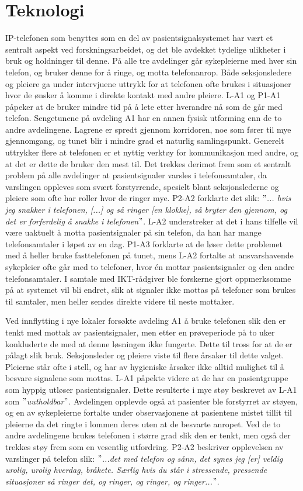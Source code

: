 \section{Teknologi}
IP-telefonen som benyttes som en del av pasientsignalsystemet har vært et sentralt aspekt ved forskningsarbeidet, og det ble avdekket tydelige ulikheter i bruk og holdninger til denne. På alle tre avdelinger går sykepleierne med hver sin telefon, og bruker denne for å ringe, og motta telefonanrop. Både seksjonsledere og pleiere ga under intervjuene uttrykk for at telefonen ofte brukes i situasjoner hvor de ønsker å komme i direkte kontakt med andre pleiere. L-A1 og P1-A1 påpeker at de bruker mindre tid på å lete etter hverandre nå som de går med telefon. Sengetunene på avdeling A1 har en annen fysisk utforming enn de to andre avdelingene. Lagrene er spredt gjennom korridoren, noe som fører til mye gjennomgang, og tunet blir i mindre grad et naturlig samlingspunkt.  Generelt uttrykker flere at telefonen er et nyttig verktøy for kommunikasjon med andre, og at det er dette de bruker den mest til. Det trekkes derimot frem som et sentralt problem på alle avdelinger at pasientsignaler varsles i telefonsamtaler, da varslingen oppleves som svært forstyrrende, spesielt blant seksjonslederne og pleiere som ofte har roller hvor de ringer mye. P2-A2 forklarte det slik: \textit{ $"$... hvis jeg snakker i telefonen, [...] og så ringer [en klokke], så bryter den gjennom, og det er forferdelig å snakke i telefonen$"$}. L-A2 understreker at det i hans tilfelle vil være uaktuelt å motta pasientsignaler på sin telefon, da han har mange telefonsamtaler i løpet av en dag. P1-A3 forklarte at de løser dette problemet med å heller bruke fasttelefonen på tunet, mens L-A2 fortalte at ansvarshavende sykepleier ofte går med to telefoner, hvor én mottar pasientsignaler og den andre telefonsamtaler. I samtale med IKT-rådgiver ble forskerne gjort oppmerksomme på at systemet vil bli endret, slik at signaler ikke mottas på telefoner som brukes til samtaler, men heller sendes direkte videre til neste mottaker.

\noindent
Ved innflytting i nye lokaler forsøkte avdeling A1 å bruke telefonen slik den er tenkt med mottak av pasientsignaler, men etter en prøveperiode på to uker konkluderte de med at denne løsningen ikke fungerte. Dette til tross for at de er pålagt slik bruk. Seksjonsleder og pleiere viste til flere årsaker til dette valget. Pleierne står ofte i stell, og har av hygieniske årsaker ikke alltid mulighet til å besvare signalene som mottas. L-A1 påpekte videre at de har en pasientgruppe som hyppig utløser pasientsignaler. Dette resulterte i mye støy beskrevet av L-A1 som \textit{$"$uutholdbar$"$}. Avdelingen opplevde også at pasienter ble forstyrret av støyen, og en av sykepleierne fortalte under observasjonene at pasientene mistet tillit til pleierne da det ringte i lommen deres uten at de besvarte anropet. Ved de to andre avdelingene brukes telefonen i større grad slik den er tenkt, men også der trekkes støy frem som en vesentlig utfordring. P2-A2 beskriver opplevelsen av varslinger på telefon slik: \textit{ $"$...det med telefon og sånn, det synes jeg [er] veldig urolig, urolig hverdag, bråkete. Særlig hvis du står i stressende, pressende situasjoner så ringer det, og ringer, og ringer, og ringer...$"$}.

